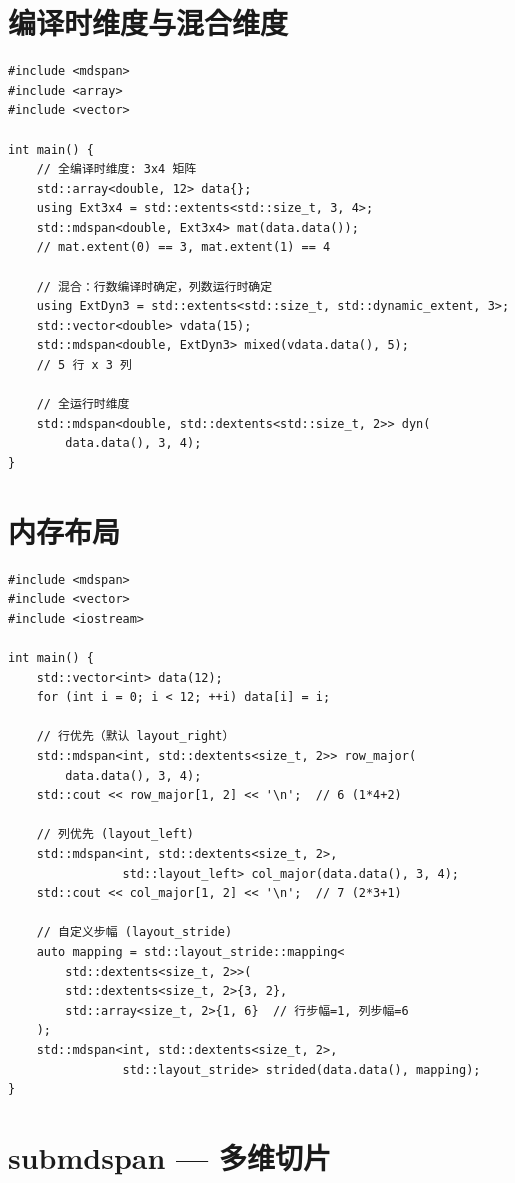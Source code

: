 \documentclass[12pt,a4paper,fontset=fandol]{ctexbook}
\begin{document}
\section{编译时维度与混合维度}

\begin{lstlisting}
#include <mdspan>
#include <array>
#include <vector>

int main() {
    // 全编译时维度: 3x4 矩阵
    std::array<double, 12> data{};
    using Ext3x4 = std::extents<std::size_t, 3, 4>;
    std::mdspan<double, Ext3x4> mat(data.data());
    // mat.extent(0) == 3, mat.extent(1) == 4

    // 混合：行数编译时确定，列数运行时确定
    using ExtDyn3 = std::extents<std::size_t, std::dynamic_extent, 3>;
    std::vector<double> vdata(15);
    std::mdspan<double, ExtDyn3> mixed(vdata.data(), 5);
    // 5 行 x 3 列

    // 全运行时维度
    std::mdspan<double, std::dextents<std::size_t, 2>> dyn(
        data.data(), 3, 4);
}
\end{lstlisting}

\section{内存布局}

\begin{lstlisting}
#include <mdspan>
#include <vector>
#include <iostream>

int main() {
    std::vector<int> data(12);
    for (int i = 0; i < 12; ++i) data[i] = i;

    // 行优先（默认 layout_right）
    std::mdspan<int, std::dextents<size_t, 2>> row_major(
        data.data(), 3, 4);
    std::cout << row_major[1, 2] << '\n';  // 6 (1*4+2)

    // 列优先 (layout_left)
    std::mdspan<int, std::dextents<size_t, 2>,
                std::layout_left> col_major(data.data(), 3, 4);
    std::cout << col_major[1, 2] << '\n';  // 7 (2*3+1)

    // 自定义步幅 (layout_stride)
    auto mapping = std::layout_stride::mapping<
        std::dextents<size_t, 2>>(
        std::dextents<size_t, 2>{3, 2},
        std::array<size_t, 2>{1, 6}  // 行步幅=1, 列步幅=6
    );
    std::mdspan<int, std::dextents<size_t, 2>,
                std::layout_stride> strided(data.data(), mapping);
}
\end{lstlisting}

\section{submdspan --- 多维切片}
\end{document}
